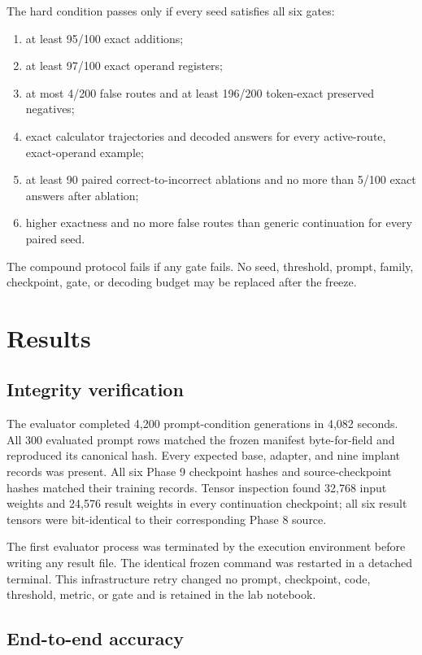 \documentclass[11pt]{article}
\begin{document}
The hard condition passes only if every seed satisfies all six gates:

\begin{enumerate}
\item at least 95/100 exact additions;
\item at least 97/100 exact operand registers;
\item at most 4/200 false routes and at least 196/200 token-exact preserved
      negatives;
\item exact calculator trajectories and decoded answers for every active-route,
      exact-operand example;
\item at least 90 paired correct-to-incorrect ablations and no more than 5/100
      exact answers after ablation;
\item higher exactness and no more false routes than generic continuation for
      every paired seed.
\end{enumerate}

The compound protocol fails if any gate fails. No seed, threshold, prompt,
family, checkpoint, gate, or decoding budget may be replaced after the freeze.

\section{Results}

\subsection{Integrity verification}

The evaluator completed 4,200 prompt-condition generations in 4,082 seconds.
All 300 evaluated prompt rows matched the frozen manifest byte-for-field and
reproduced its canonical hash. Every expected base, adapter, and nine implant
records was present. All six Phase 9 checkpoint hashes and source-checkpoint
hashes matched their training records. Tensor inspection found 32,768 input
weights and 24,576 result weights in every continuation checkpoint; all six
result tensors were bit-identical to their corresponding Phase 8 source.

The first evaluator process was terminated by the execution environment before
writing any result file. The identical frozen command was restarted in a
detached terminal. This infrastructure retry changed no prompt, checkpoint,
code, threshold, metric, or gate and is retained in the lab notebook.

\subsection{End-to-end accuracy}
\end{document}
